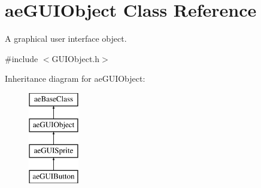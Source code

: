 \hypertarget{classae_g_u_i_object}{}\section{ae\+G\+U\+I\+Object Class Reference}
\label{classae_g_u_i_object}


A graphical user interface object.  




{\ttfamily \#include $<$G\+U\+I\+Object.\+h$>$}

Inheritance diagram for ae\+G\+U\+I\+Object\+:\begin{figure}[H]
\begin{center}
\leavevmode
\includegraphics[height=4.000000cm]{classae_g_u_i_object}
\end{center}
\end{figure}
